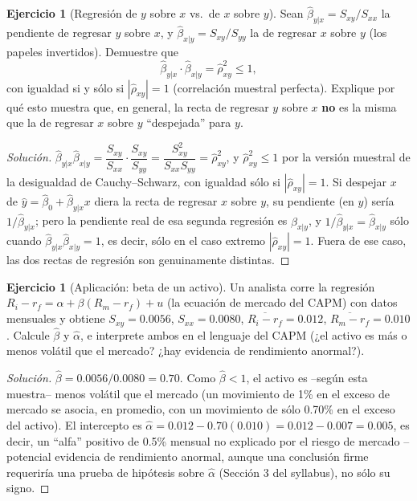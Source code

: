 \documentclass[11pt,a4paper,oneside]{article}
\theoremstyle{plain}
\theoremstyle{definition}
\newtheorem{exercise}[teorema]{Ejercicio}
\begin{document}
\begin{exercise}[Regresión de $y$ sobre $x$ vs.\ de $x$ sobre $y$]\label{ej:reversa}
Sean $\hat\beta_{y|x}=S_{xy}/S_{xx}$ la pendiente de regresar $y$ sobre
$x$, y $\hat\beta_{x|y}=S_{xy}/S_{yy}$ la de regresar $x$ sobre $y$ (los
papeles invertidos). Demuestre que
\[
  \hat\beta_{y|x}\cdot\hat\beta_{x|y} = \hat\rho_{xy}^2 \le 1,
\]
con igualdad si y sólo si $|\hat\rho_{xy}|=1$ (correlación muestral
perfecta). Explique por qué esto muestra que, en general, la recta de
regresar $y$ sobre $x$ \textbf{no} es la misma que la de regresar $x$
sobre $y$ ``despejada'' para $y$.
\end{exercise}
\begin{proof}[Solución]
$\hat\beta_{y|x}\hat\beta_{x|y} = \dfrac{S_{xy}}{S_{xx}}\cdot
\dfrac{S_{xy}}{S_{yy}} = \dfrac{S_{xy}^2}{S_{xx}S_{yy}} =
\hat\rho_{xy}^2$, y $\hat\rho_{xy}^2\le1$ por la versión muestral de la
desigualdad de Cauchy--Schwarz, con igualdad sólo si $|\hat\rho_{xy}|=1$.
Si despejar $x$ de $\hat y=\hat\beta_0+\hat\beta_{y|x}x$ diera la recta
de regresar $x$ sobre $y$, su pendiente (en $y$) sería
$1/\hat\beta_{y|x}$; pero la pendiente real de esa segunda regresión es
$\hat\beta_{x|y}$, y $1/\hat\beta_{y|x}=\hat\beta_{x|y}$ sólo cuando
$\hat\beta_{y|x}\hat\beta_{x|y}=1$, es decir, sólo en el caso extremo
$|\hat\rho_{xy}|=1$. Fuera de ese caso, las dos rectas de regresión son
genuinamente distintas.
\end{proof}

\begin{exercise}[Aplicación: beta de un activo]\label{ej:capm}
Un analista corre la regresión $R_i - r_f = \alpha + \beta(R_m-r_f)+u$
(la ecuación de mercado del CAPM) con datos mensuales y obtiene
$S_{xy}=0.0056$, $S_{xx}=0.0080$, $\overline{R_i-r_f}=0.012$,
$\overline{R_m-r_f}=0.010$. Calcule $\hat\beta$ y $\hat\alpha$, e
interprete ambos en el lenguaje del CAPM (¿el activo es más o menos
volátil que el mercado? ¿hay evidencia de rendimiento anormal?).
\end{exercise}
\begin{proof}[Solución]
$\hat\beta = 0.0056/0.0080 = 0.70$. Como $\hat\beta<1$, el activo es
--según esta muestra-- menos volátil que el mercado (un movimiento de
1\% en el exceso de mercado se asocia, en promedio, con un movimiento de
sólo 0.70\% en el exceso del activo). El intercepto es
$\hat\alpha = 0.012-0.70(0.010)=0.012-0.007=0.005$, es decir, un
``alfa'' positivo de 0.5\% mensual no explicado por el riesgo de
mercado --potencial evidencia de rendimiento anormal, aunque una
conclusión firme requeriría una prueba de hipótesis sobre $\hat\alpha$
(Sección 3 del syllabus), no sólo su signo.
\end{proof}
\end{document}
